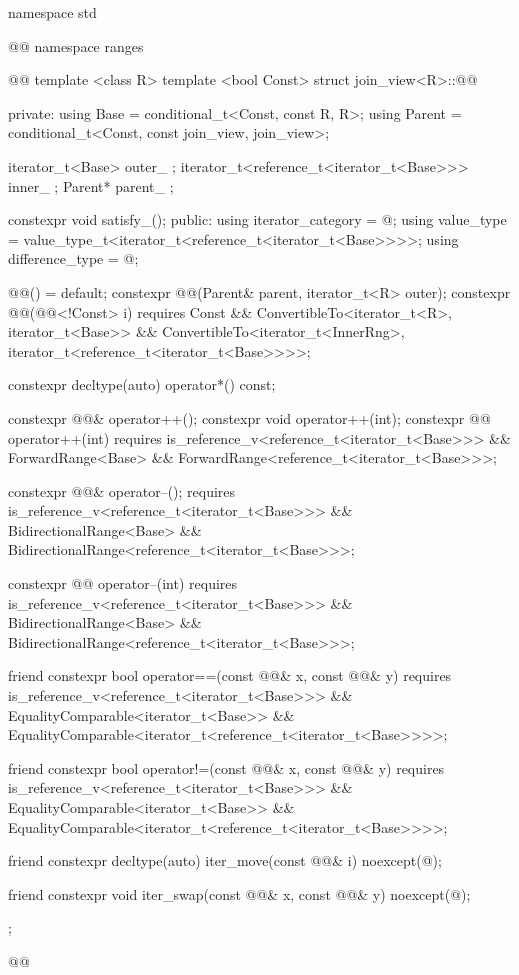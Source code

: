 \begin{codeblock}
namespace std { @@ namespace ranges { @@
template <class R>
  template <bool Const>
  struct join_view<R>::@@ {
  private:
    using Base = conditional_t<Const, const R, R>;
    using Parent = conditional_t<Const, const join_view, join_view>;

    iterator_t<Base> outer_ {};
    iterator_t<reference_t<iterator_t<Base>>> inner_ {};
    Parent* parent_ {};

    constexpr void satisfy_();
  public:
    using iterator_category = @\seebelow@;
    using value_type = value_type_t<iterator_t<reference_t<iterator_t<Base>>>>;
    using difference_type = @\seebelow@;

    @@() = default;
    constexpr @@(Parent& parent, iterator_t<R> outer);
    constexpr @@(@@<!Const> i) requires Const &&
        ConvertibleTo<iterator_t<R>, iterator_t<Base>> &&
        ConvertibleTo<iterator_t<InnerRng>,
            iterator_t<reference_t<iterator_t<Base>>>>;

    constexpr decltype(auto) operator*() const;

    constexpr @@& operator++();
    constexpr void operator++(int);
    constexpr @@ operator++(int)
        requires is_reference_v<reference_t<iterator_t<Base>>> &&
            ForwardRange<Base> &&
            ForwardRange<reference_t<iterator_t<Base>>>;

    constexpr @@& operator--();
        requires is_reference_v<reference_t<iterator_t<Base>>> &&
            BidirectionalRange<Base> &&
            BidirectionalRange<reference_t<iterator_t<Base>>>;

    constexpr @@ operator--(int)
        requires is_reference_v<reference_t<iterator_t<Base>>> &&
            BidirectionalRange<Base> &&
            BidirectionalRange<reference_t<iterator_t<Base>>>;

    friend constexpr bool operator==(const @@& x, const @@& y)
    requires is_reference_v<reference_t<iterator_t<Base>>> &&
        EqualityComparable<iterator_t<Base>> &&
        EqualityComparable<iterator_t<reference_t<iterator_t<Base>>>>;

    friend constexpr bool operator!=(const @@& x, const @@& y)
    requires is_reference_v<reference_t<iterator_t<Base>>> &&
        EqualityComparable<iterator_t<Base>> &&
        EqualityComparable<iterator_t<reference_t<iterator_t<Base>>>>;

    friend constexpr decltype(auto) iter_move(const @@& i)
        noexcept(@\seebelow@);

    friend constexpr void iter_swap(const @@& x, const @@& y)
        noexcept(@\seebelow@);
  };
}}@\removed{\}\}}@
\end{codeblock}

